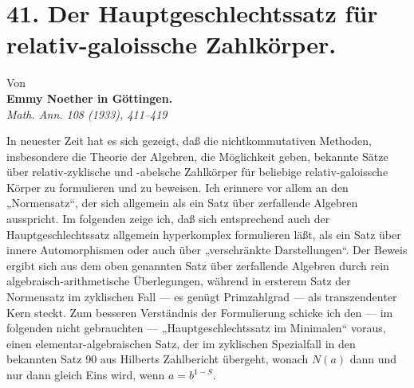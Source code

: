 \section*{41. Der Hauptgeschlechtssatz für relativ-galoissche Zahlkörper.}

\begin{center}
Von\\[0.4ex]
\textbf{Emmy Noether in Göttingen.}\\[0.8ex]
\emph{Math. Ann. 108 (1933), 411--419}
\end{center}

In neuester Zeit hat es sich gezeigt, daß die nichtkommutativen Methoden, insbesondere die Theorie der Algebren, die Möglichkeit geben, bekannte Sätze über relativ-zyklische und -abelsche Zahlkörper für beliebige relativ-galoissche Körper zu formulieren und zu beweisen. Ich erinnere vor allem an den „Normensatz“, der sich allgemein als ein Satz über zerfallende Algebren ausspricht. Im folgenden zeige ich, daß sich entsprechend auch der Hauptgeschlechtssatz allgemein hyperkomplex formulieren läßt, als ein Satz über innere Automorphismen oder auch über „verschränkte Darstellungen“. Der Beweis ergibt sich aus dem oben genannten Satz über zerfallende Algebren durch rein algebraisch-arithmetische Überlegungen, während in ersterem Satz der Normensatz im zyklischen Fall --- es genügt Primzahlgrad --- als transzendenter Kern steckt. Zum besseren Verständnis der Formulierung schicke ich den --- im folgenden nicht gebrauchten --- „Hauptgeschlechtssatz im Minimalen“ voraus, einen elementar-algebraischen Satz, der im zyklischen Spezialfall in den bekannten Satz 90 aus Hilberts Zahlbericht übergeht, wonach \(N(a)\) dann und nur dann gleich Eins wird, wenn \(a=b^{1-S}\).

